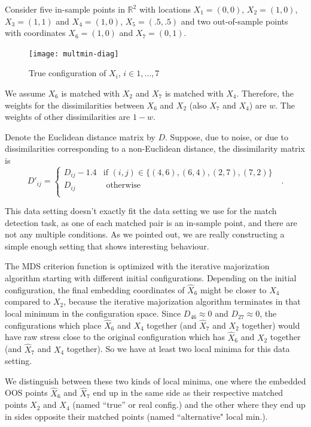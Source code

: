 \documentclass[12pt,oneside,final]{thesis}
\begin{document}

Consider five in-sample points in $\mathbb{R}^2$ with locations $X_1=(0,0)$, $X_2=(1,0)$, $X_3=(1,1)$
and $X_4=(1,0)$, $X_5=(.5,.5)$ and two out-of-sample  points with coordinates $X_6=(1,0)$ and $X_7=(0,1)$.
\begin{figure}
\centering
\texttt{[image: multmin-diag]}
\caption{True configuration of $X_{i}$, $i \in {1,\ldots,7}$}
\label{original-config}
\end{figure} 
We assume $X_6$ is matched with $X_2$ and $X_7$ is matched with $X_4$. Therefore, the weights for the dissimilarities between $X_6$ and  $X_2$ (also  $X_7$ and $X_4$)  are $w$. The weights of other dissimilarities are $1-w$.

Denote the Euclidean distance matrix by $D$. 
Suppose, due to noise, or due to dissimilarities corresponding to a non-Euclidean distance, 
the dissimilarity matrix is $$D'_{ij}=\begin{cases}
D_{ij}-1.4 & \textrm{if  $(i,j) \in \{(4,6),(6,4),(2,7),(7,2)   \}$ }\\
D_{ij}  & \textrm{ otherwise}\\
\end{cases}.$$ 

\begin{remark}
This data setting doesn't exactly fit the data setting we use for the match detection task, as one of each matched pair is an in-sample point, and there are not any multiple conditions. As we pointed out, we are really constructing  a  simple  enough setting that shows interesting behaviour.
\end{remark}

The MDS criterion function is optimized with the iterative majorization algorithm starting with different initial configurations.   Depending on the initial configuration, the final embedding coordinates of $\hat{X}_6$ might be closer
to $X_4$ compared to $X_2$, because the iterative majorization algorithm terminates in that  local minimum in the configuration space. Since $D_{46}\approx 0$ and $D_{27}\approx 0$, the configurations  which place $\hat{X}_6$ and $X_4$ together (and $\hat{X}_7$ and $X_2$ together) would have  raw stress  close to the  original  configuration which has $\hat{X}_6$ and $X_2$ together (and $\hat{X}_7$ and $X_4$ together). So we have at least two local minima for this data setting.

We distinguish between these two kinds of local minima, one where the embedded OOS points $\hat{X}_6$ and $\hat{X}_7$ end up in the same side as their respective matched points $X_2$ and $X_4$ (named ``true'' or real config.) and the other where they end up in sides  opposite their matched points (named ``alternative" local min.). 
\end{document}
